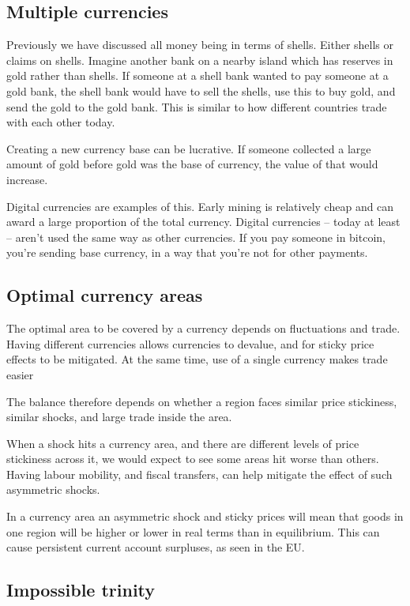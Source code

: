 
\subsection{Multiple currencies}

Previously we have discussed all money being in terms of shells. Either shells or claims on shells. Imagine another bank on a nearby island which has reserves in gold rather than shells. If someone at a shell bank wanted to pay someone at a gold bank, the shell bank would have to sell the shells, use this to buy gold, and send the gold to the gold bank. This is similar to how different countries trade with each other today.

Creating a new currency base can be lucrative. If someone collected a large amount of gold before gold was the base of currency, the value of that would increase.

Digital currencies are examples of this. Early mining is relatively cheap and can award a large proportion of the total currency. Digital currencies – today at least – aren’t used the same way as other currencies. If you pay someone in bitcoin, you’re sending base currency, in a way that you’re not for other payments.

\subsection{Optimal currency areas}

The optimal area to be covered by a currency depends on fluctuations and trade. Having different currencies allows currencies to devalue, and for sticky price effects to be mitigated. At the same time, use of a single currency makes trade easier

The balance therefore depends on whether a region faces similar price stickiness, similar shocks, and large trade inside the area.

When a shock hits a currency area, and there are different levels of price stickiness across it, we would expect to see some areas hit worse than others. Having labour mobility, and fiscal transfers, can help mitigate the effect of such asymmetric shocks.

In a currency area an asymmetric shock and sticky prices will mean that goods in one region will be higher or lower in real terms than in equilibrium. This can cause persistent current account surpluses, as seen in the EU.

\subsection{Impossible trinity}

